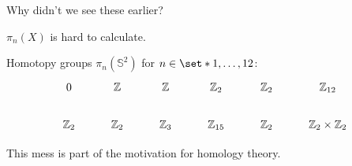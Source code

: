 \begin{frame}{Why didn't we see these earlier?} %

  \pause
  \begin{block}{}
    \centering
    $\pi_n (X)$ is hard to calculate.
  \end{block}

  \pause
  \par{} Homotopy groups $\pi_n (\mathbb{S}^2)$ for $n \in \set*{1, \dots, 12}$:
  \begin{align*}
    \begin{tikzcd}[
      ampersand replacement = \;
    ]
      0
      \; \mathbb{Z}
      \; \mathbb{Z}
      \; \mathbb{Z}_2
      \; \mathbb{Z}_2
      \; \mathbb{Z}_{12}
      \\
      \mathbb{Z}_2
      \; \mathbb{Z}_2
      \; \mathbb{Z}_3
      \; \mathbb{Z}_{15}
      \; \mathbb{Z}_2
      \; \mathbb{Z}_2 \times \mathbb{Z}_2
    \end{tikzcd}
  \end{align*}
  \par This mess is part of the motivation for homology theory.
  
\end{frame}
